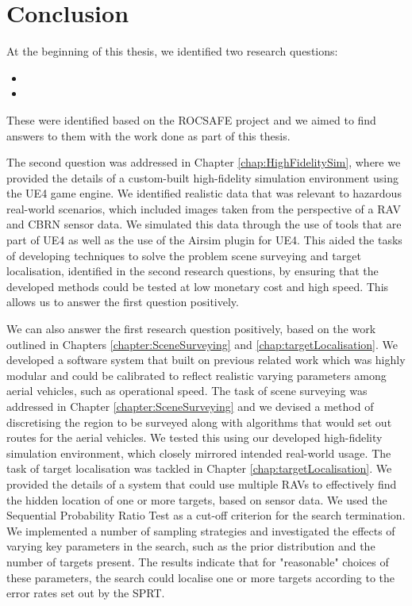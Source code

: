 
\chapter{Conclusion}
At the beginning of this thesis, we identified two research questions: 
\begin{itemize}
    \item  
    \item 
\end{itemize}
These were identified based on the ROCSAFE project and we aimed to find answers to them with the work done as part of this thesis.

\par The second question was addressed in Chapter \ref{chap:HighFidelitySim}, where we provided the details of a custom-built high-fidelity simulation environment using the UE4 game engine. We identified realistic data that was relevant to hazardous real-world scenarios, which included images taken from the perspective of a RAV and CBRN sensor data. We simulated this data through the use of tools that are part of UE4 as well as the use of the Airsim \cite{Shah2017AirSim:Vehicles} plugin for UE4. This aided the tasks of developing techniques to solve the problem scene surveying and target localisation, identified in the second research questions, by ensuring that the developed methods could be tested at low monetary cost and high speed. This allows us to answer the first question positively.

\par We can also answer the first research question positively, based on the work outlined in Chapters \ref{chapter:SceneSurveying} and \ref{chap:targetLocalisation}. We developed a software system that built on previous related work which was highly modular and could be calibrated to reflect realistic varying parameters among aerial vehicles, such as operational speed. The task of scene surveying was addressed in Chapter \ref{chapter:SceneSurveying} and we devised a method of discretising the region to be surveyed along with algorithms that would set out routes for the aerial vehicles. We tested this using our developed high-fidelity simulation environment, which closely mirrored intended real-world usage. The task of target localisation was tackled in Chapter \ref{chap:targetLocalisation}. We provided the details of a system that could use multiple RAVs to effectively find the hidden location of one or more targets, based on sensor data. We used the Sequential Probability Ratio Test as a cut-off criterion for the search termination. We implemented a number of sampling strategies and investigated the effects of varying key parameters in the search, such as the prior distribution and the number of targets present. The results indicate that for "reasonable" choices of these parameters, the search could localise one or more targets according to the error rates set out by the SPRT. 
